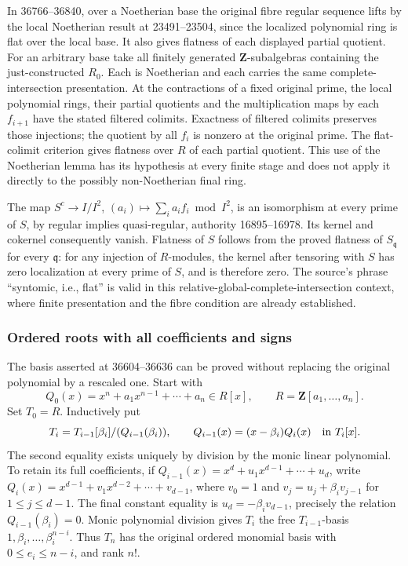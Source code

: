 In 36766--36840, over a Noetherian base the original fibre regular sequence lifts by the local Noetherian result at 23491--23504, since the localized polynomial ring is flat over the local base. It also gives flatness of each displayed partial quotient. For an arbitrary base take all finitely generated \(\mathbf Z\)-subalgebras containing the just-constructed \(R_0\). Each is Noetherian and each carries the same complete-intersection presentation. At the contractions of a fixed original prime, the local polynomial rings, their partial quotients and the multiplication maps by each \(f_{i+1}\) have the stated filtered colimits. Exactness of filtered colimits preserves those injections; the quotient by all \(f_i\) is nonzero at the original prime. The flat-colimit criterion gives flatness over \(R\) of each partial quotient. This use of the Noetherian lemma has its hypothesis at every finite stage and does not apply it directly to the possibly non-Noetherian final ring.

The map \(S^c\to I/I^2\), \((a_i)\mapsto\sum_i a_i f_i\bmod I^2\), is an isomorphism at every prime of \(S\), by regular implies quasi-regular, authority 16895--16978. Its kernel and cokernel consequently vanish. Flatness of \(S\) follows from the proved flatness of \(S_{\mathfrak q}\) for every \(\mathfrak q\): for any injection of \(R\)-modules, the kernel after tensoring with \(S\) has zero localization at every prime of \(S\), and is therefore zero. The source's phrase ``syntomic, i.e., flat'' is valid in this relative-global-complete-intersection context, where finite presentation and the fibre condition are already established.

\subsubsection{Ordered roots with all coefficients and signs}\label{ordered-roots-with-all-coefficients-and-signs}

The basis asserted at 36604--36636 can be proved without replacing the original polynomial by a rescaled one. Start with \[
Q_0(x)=x^n+a_1x^{n-1}+\cdots+a_n\in R[x],\qquad
R=\mathbf Z[a_1,\ldots,a_n].
\] Set \(T_0=R\). Inductively put \[
T_i=T_{i-1}[\beta_i]/(Q_{i-1}(\beta_i)),\qquad
Q_{i-1}(x)=(x-\beta_i)Q_i(x)\quad\hbox{in }T_i[x].
\] The second equality exists uniquely by division by the monic linear polynomial. To retain its full coefficients, if \(Q_{i-1}(x)=x^d+u_1x^{d-1}+\cdots+u_d\), write \(Q_i(x)=x^{d-1}+v_1x^{d-2}+\cdots+v_{d-1}\), where \(v_0=1\) and \(v_j=u_j+\beta_i v_{j-1}\) for \(1\le j\le d-1\). The final constant equality is \(u_d=-\beta_i v_{d-1}\), precisely the relation \(Q_{i-1}(\beta_i)=0\). Monic polynomial division gives \(T_i\) the free \(T_{i-1}\)-basis \(1,\beta_i,\ldots,\beta_i^{n-i}\). Thus \(T_n\) has the original ordered monomial basis with \(0\le e_i\le n-i\), and rank \(n!\).

